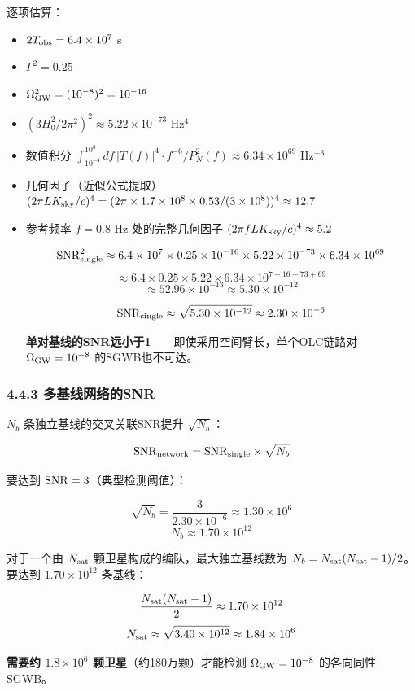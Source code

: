 \documentclass[12pt,a4paper]{article}
\begin{document}
逐项估算：
\begin{itemize}
  \item $2T_{\rm obs} = 6.4 \times 10^7$ s
  \item $\Gamma^2 = 0.25$
  \item $\Omega_{\rm GW}^2 = (10^{-8})^2 = 10^{-16}$
  \item $(3H_0^2/2\pi^2)^2 \approx 5.22 \times 10^{-73}$ Hz$^4$
  \item 数值积分 $\int_{10^{-4}}^{10^3} df\, |T(f)|^4 \cdot f^{-6}/P_N^2(f) \approx 6.34 \times 10^{69}$ Hz$^{-3}$
  \item 几何因子（近似公式提取）$(2\pi L K_{\rm sky}/c)^4 = (2\pi \times 1.7\times 10^8 \times 0.53/(3\times 10^8))^4 \approx 12.7$
  \item 参考频率 $f = 0.8$ Hz 处的完整几何因子 $(2\pi f L K_{\rm sky}/c)^4 \approx 5.2$

$${\rm SNR}_{\rm single}^2 \approx 6.4 \times 10^7 \times 0.25 \times 10^{-16} \times 5.22 \times 10^{-73} \times 6.34 \times 10^{69}$$
$$\approx 6.4 \times 0.25 \times 5.22 \times 6.34 \times 10^{7-16-73+69}$$
$$\approx 52.96 \times 10^{-13} \approx 5.30 \times 10^{-12}$$

$${\rm SNR}_{\rm single} \approx \sqrt{5.30 \times 10^{-12}} \approx 2.30 \times 10^{-6}$$

\textbf{单对基线的SNR远小于1}——即使采用空间臂长，单个OLC链路对 $\Omega_{\rm GW} = 10^{-8}$ 的SGWB也不可达。
\end{itemize}
\subsubsection{4.4.3 多基线网络的SNR}


$N_b$ 条独立基线的交叉关联SNR提升 $\sqrt{N_b}$：

$${\rm SNR}_{\rm network} = {\rm SNR}_{\rm single} \times \sqrt{N_b}$$

要达到 ${\rm SNR} = 3$（典型检测阈值）：

$$\sqrt{N_b} = \frac{3}{2.30 \times 10^{-6}} \approx 1.30 \times 10^6$$
$$N_b \approx 1.70 \times 10^{12}$$

对于一个由 $N_{\rm sat}$ 颗卫星构成的编队，最大独立基线数为 $N_b = N_{\rm sat}(N_{\rm sat}-1)/2$。要达到 $1.70 \times 10^{12}$ 条基线：

$$\frac{N_{\rm sat}(N_{\rm sat}-1)}{2} \approx 1.70 \times 10^{12}$$
$$N_{\rm sat} \approx \sqrt{3.40 \times 10^{12}} \approx 1.84 \times 10^6$$

\textbf{需要约 $1.8 \times 10^6$ 颗卫星}（约180万颗）才能检测 $\Omega_{\rm GW} = 10^{-8}$ 的各向同性SGWB。
\end{document}
